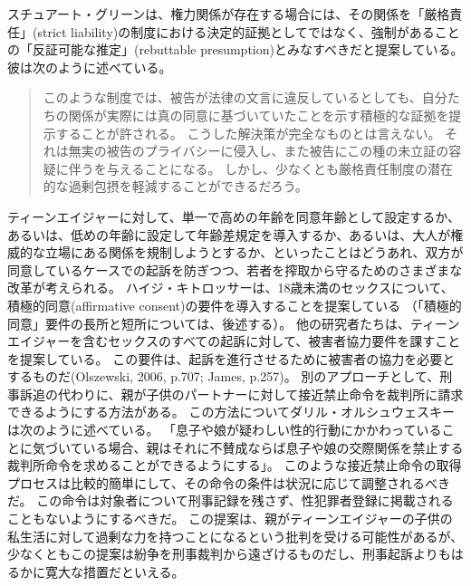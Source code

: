 \documentclass[paper=a4,book,openany]{jlreq}
\newcommand{\ig}[1]{}           %
\begin{document}
スチュアート・グリーン\ig{Stuart Green}は、権力関係が存在する場合には、その関係を「厳格責任」(strict liability)の制度における決定的証拠としてではなく、強制があることの「反証可能な推定」(rebuttable presumption)とみなすべきだと提案している。
彼は次のように述べている。

\begin{quote}
このような制度では、被告が法律の文言に違反しているとしても、自分たちの関係が実際には真の同意に基づいていたことを示す積極的な証拠を提示することが許される。
こうした解決策が完全なものとは言えない。
それは無実の被告のプライバシーに侵入し、また被告にこの種の未立証の容疑に伴うを与えることになる。
しかし、少なくとも厳格責任制度の潜在的な過剰包摂を軽減することができるだろう。
\citep{green17:_how_crimin_inces}
\end{quote}

ティーンエイジャーに対して、単一で高めの年齢を同意年齢として設定するか、あるいは、低めの年齢に設定して年齢差規定を導入するか、あるいは、大人が権威的な立場にある関係を規制しようとするか、といったことはどうあれ、双方が同意しているケースでの起訴を防ぎつつ、若者を搾取から守るためのさまざまな改革が考えられる。
ハイジ・キトロッサーは、18歳未満のセックスについて、積極的同意(affirmative consent)の要件を導入することを提案している\citep{kitrosser97:_meanin_consen}
（「積極的同意」要件の長所と短所については、後述する）。
他の研究者たちは、ティーンエイジャーを含むセックスのすべての起訴に対して、被害者協力要件を課すことを提案している。
この要件は、起訴を進行させるために被害者の協力を必要とするものだ(Olszewski, 2006, p.707; James, p.257)。
\nocite{olszewski06:_commen_statut_rape_wiscon}\nocite{james09:_romeo_juliet_were_sex_offen}
別のアプローチとして、刑事訴追の代わりに、親が子供のパートナーに対して接近禁止命令を裁判所に請求できるようにする方法がある。
この方法についてダリル・オルシュウェスキーは次のように述べている。
「息子や娘が疑わしい性的行動にかかわっていることに気づいている場合、親はそれに不賛成ならば息子や娘の交際関係を禁止する裁判所命令を求めることができるようにする」\citep[p.718]{olszewski06:_commen_statut_rape_wiscon}。
このような接近禁止命令の取得プロセスは比較的簡単にして、その命令の条件は状況に応じて調整されるべきだ。
この命令は対象者について刑事記録を残さず、性犯罪者登録に掲載されることもないようにするべきだ。
この提案は、親がティーンエイジャーの子供の私生活に対して過剰な力を持つことになるという批判を受ける可能性があるが、少なくともこの提案は紛争を刑事裁判から遠ざけるものだし、刑事起訴よりもはるかに寛大な措置だといえる。
\end{document}
